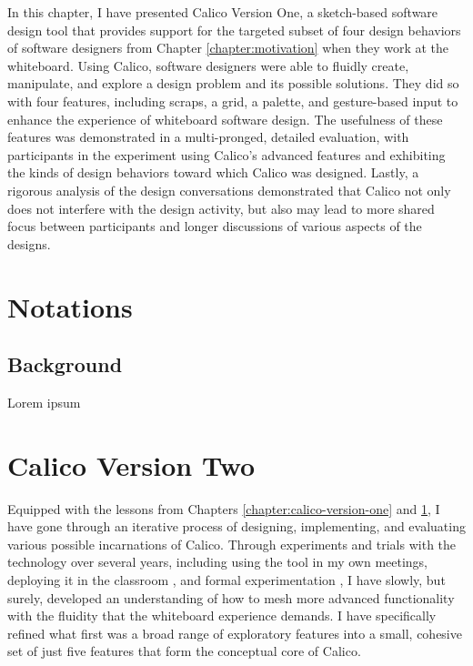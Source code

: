 \documentclass[12pt,fleqn]{ucithesis}
\begin{document}
In this chapter, I have presented Calico Version One, a sketch-based software design tool that provides support for the targeted subset of four design behaviors of software designers from Chapter \ref{chapter:motivation} when they work at the whiteboard. Using Calico, software designers were able to fluidly create, manipulate, and explore a design problem and its possible solutions. They did so with four features, including scraps, a grid, a palette, and gesture-based input to enhance the experience of whiteboard software design. The usefulness of these features was demonstrated in a multi-pronged, detailed evaluation, with participants in the experiment using Calico's advanced features and exhibiting the kinds of design behaviors toward which Calico was designed. Lastly, a rigorous analysis of the design conversations demonstrated that Calico not only does not interfere with the design activity, but also may lead to more shared focus between participants and longer discussions of various aspects of the designs.

 \newpage 
 \newpage \chapter{Notations}
\label{chapter:notation-paper}

\section{Background}

Lorem ipsum 

 \newpage 
 \newpage \chapter{Calico Version Two}
\label{chapter:calico-version-two}

Equipped with the lessons from Chapters \ref{chapter:calico-version-one} and \ref{chapter:notation-paper}, I have gone through an iterative process of designing, implementing, and evaluating various possible incarnations of Calico. Through experiments and trials with the technology over several years, including using the tool in my own meetings, deploying it in the classroom \cite{Loksa2013}, and formal experimentation \cite{mangano2012design}, I have slowly, but surely, developed an understanding of how to mesh more advanced functionality with the fluidity that the whiteboard experience demands. I have specifically refined what first was a broad range of exploratory features into a small, cohesive set of just five features that form the conceptual core of Calico.
\end{document}
